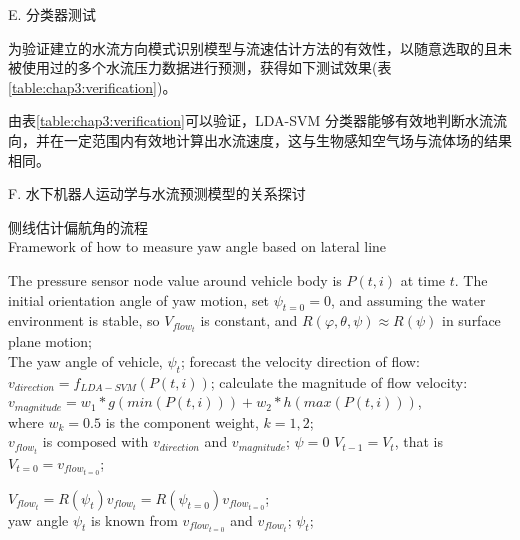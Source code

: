 E. {分类器测试 }

为验证建立的水流方向模式识别模型与流速估计方法的有效性，以随意选取的且未被使用过的多个水流压力数据进行预测，获得如下测试效果(表\ref{table:chap3:verification})。

由表\ref{table:chap3:verification}可以验证，LDA-SVM 分类器能够有效地判断水流流向，并在一定范围内有效地计算出水流速度，这与生物感知空气场与流体场的结果相同。

F. {水下机器人运动学与水流预测模型的关系探讨   }

\begin{algorithm}[!htbp]
\centering
\caption{侧线估计偏航角的流程 \protect \\\quad \quad Framework of how to measure yaw angle based on lateral line}
\label{Algorithm:chap3:Framwork}
\begin{algorithmic}[1]
\REQUIRE
The pressure sensor node value around vehicle body is $P \left (t,i \right )$ at time $t$. The initial orientation angle of yaw motion, set $\psi_{t=0} =0$, and assuming the water environment is stable, so $V_{flow_{t}}$ is constant, and $R\left (\varphi,\theta,\psi  \right )\approx R\left ( \psi \right )$ in surface plane motion;\\

\ENSURE
The yaw angle of vehicle, $\psi_t$;
    \STATE forecast the velocity direction of flow: \\
    $ v_{direction} = f_{LDA-SVM}\left ( P \left (t,i \right ) \right )$;
    \STATE calculate the magnitude of flow velocity: \\
    $v_{magnitude} = w_1\ast g\left(min\left( P \left (t,i \right ) \right)\right)
    + w_2 \ast  h\left(max\left(    P \left (t,i \right )    \right)\right)   $, \\where $w_k =0.5$  is the component weight, $k = 1,2$;\\

    \STATE ${v_{flow_t}}$ is composed with $ v_{direction}$ and $v_{magnitude}$;
        \STATE $ \psi = 0 $
        \STATE $ V_{t-1} = V_t $,
        that is $V_{t=0} = v_{flow_{t=0}}$;
    \ENDIF

    \STATE ${V_{flow_t}}= R\left( \psi_t \right){v_{flow_t}}
    = R\left( \psi_{t=0} \right){v_{flow_{t=0}}}$;\\
    \STATE yaw angle $\psi_t$ is known from $v_{flow_{t=0}}$ and $v_{flow_t}$;
\ENDFOR
\RETURN
 $\psi_t$;
\end{algorithmic}
\end{algorithm}


